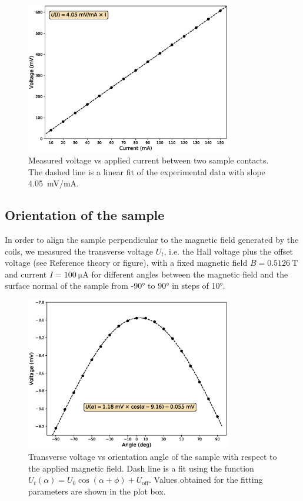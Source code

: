 \documentclass[11pt,a4paper]{article}
\begin{document}
\begin{figure}[ht]
\centering
\includegraphics[width=0.8\textwidth]{Voltage_vs_current_ohmic_test.eps}
\caption{Measured voltage vs applied current between two sample contacts. The dashed line is a linear fit of the experimental data with slope \SI{4.05}{\milli\volt/\milli\ampere}.}
\label{fig:ohmic_check}
\end{figure}

\subsection{Orientation of the sample}

In order to align the sample perpendicular to the magnetic field generated by the coils, we measured the transverse voltage $U_t$, i.e. the Hall voltage plus the offset voltage (see {\color{red}Reference theory or figure}), with a fixed magnetic field $B=\SI{0.5126}{\tesla}$ and current $I=\SI{100}{\micro\ampere}$ for different angles between the magnetic field and the surface normal of the sample from \ang{-90} to \ang{90} in steps of \ang{10}.

\begin{figure}[ht]
\centering
\includegraphics[width=0.8\textwidth]{Voltage_vs_angle.eps}
\caption{Transverse voltage vs orientation angle of the sample with respect to the applied magnetic field. Dash line is a fit using the function $U_t(\alpha)=U_0\cos(\alpha+\phi) + U_\text{off}$. Values obtained for the fitting parameters are shown in the plot box.}
\label{fig:orientation}
\end{figure}
\end{document}
